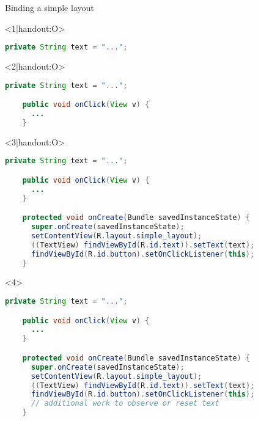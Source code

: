 \begin{frame}[fragile]{Binding a simple layout}
\begin{onlyenv}<1|handout:O>
  \begin{lstlisting}[language=Java]
    private String text = "...";
  \end{lstlisting}
\end{onlyenv}
\begin{onlyenv}<2|handout:O>
  \begin{lstlisting}[language=Java]
    private String text = "...";

    public void onClick(View v) {
      ...
    }
  \end{lstlisting}
\end{onlyenv}
\begin{onlyenv}<3|handout:O>
  \begin{lstlisting}[language=Java]
    private String text = "...";

    public void onClick(View v) {
      ...
    }

    protected void onCreate(Bundle savedInstanceState) {
      super.onCreate(savedInstanceState);
      setContentView(R.layout.simple_layout);
      ((TextView) findViewById(R.id.text)).setText(text);
      findViewById(R.id.button).setOnClickListener(this);
    }
  \end{lstlisting}
\end{onlyenv}
\begin{onlyenv}<4>
  \begin{lstlisting}[language=Java]
    private String text = "...";

    public void onClick(View v) {
      ...
    }

    protected void onCreate(Bundle savedInstanceState) {
      super.onCreate(savedInstanceState);
      setContentView(R.layout.simple_layout);
      ((TextView) findViewById(R.id.text)).setText(text);
      findViewById(R.id.button).setOnClickListener(this);
      // additional work to observe or reset text
    }
  \end{lstlisting}
\end{onlyenv}
\end{frame}

